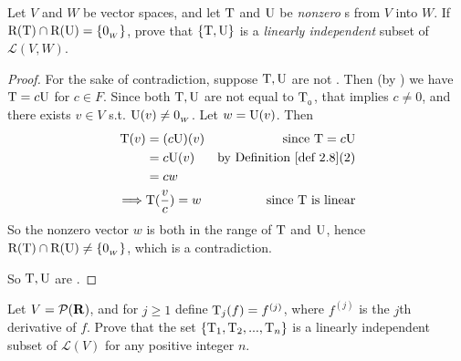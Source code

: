 \begin{exercise} \label{exercise 2.2.14}
Let \(V\) and \(W\) be vector spaces, and let \(\mathrm{T}\) and \(\mathrm{U}\) be \emph{nonzero} \LTRAN{}s from \(V\) into \(W\).
If \(\mathrm{R(T)} \cap \mathrm{R}(\mathrm{U}) = \{ 0_{_W} \}\), prove that
\(\{ \mathrm{T}, \mathrm{U} \}\) is a \emph{linearly independent} subset of \(\mathcal{L}(V, W)\).
\end{exercise}

\begin{proof}
For the sake of contradiction, suppose \(\mathrm{T}, \mathrm{U}\) are not \LID{}.
Then (by ) we have \(\mathrm{T} = c\mathrm{U}\) for \(c \in F\).
Since both \(\mathrm{T}, \mathrm{U}\) are not equal to \(\mathrm{T}_{_0}\), that implies \(c \ne 0\), and there exists \(v \in V\) s.t. \(\mathrm{U}(v) \ne 0_{_W}\).
Let \(w = \mathrm{U}(v)\).
Then
\begin{align*}
    \T(v) & = (c\U)(v) & \text{since \(\T = c\U\)} \\
          & = c\U(v) & \text{by \DEF{2.8}(2)} \\
          & = cw \\
    \implies & \T(\frac{v}{c}) = w & \text{since \(\T\) is linear}
\end{align*}
So the nonzero vector \(w\) is both in the range of \(\mathrm{T}\) and \(\mathrm{U}\), hence \(\mathrm{R(T)} \cap \mathrm{R}(\mathrm{U}) \ne \{ 0_{_W} \}\), which is a contradiction.

So \(\mathrm{T}, \mathrm{U}\) are \LID{}.
\end{proof}

\begin{exercise} \label{exercise 2.2.15}
Let \(V = \mathcal{P}(\mathbf{R})\), and for \(j \ge 1\) define \(\mathrm{T}_j(f) = f^{(j)}\), where \(f^{(j)}\) is the \(j\)th derivative of \(f\).
Prove that the set \(\{ \mathrm{T}_1, \mathrm{T}_2, ..., \mathrm{T}_n \}\) is a
linearly independent subset of \(\mathcal{L}(V)\) for any positive integer \(n\).
\end{exercise}

